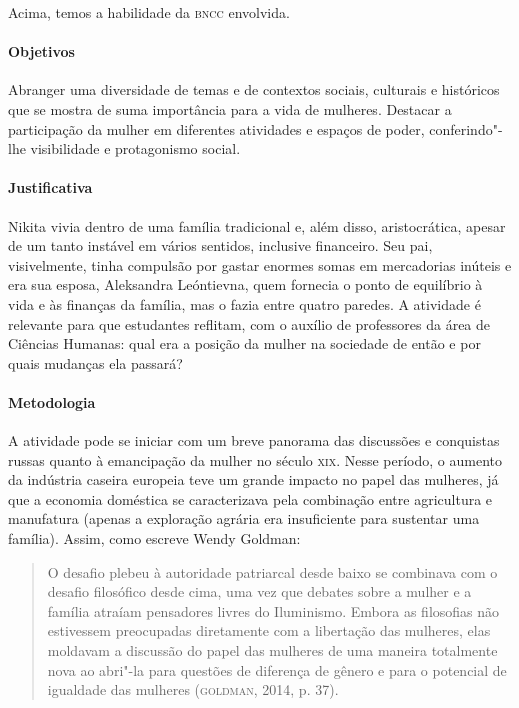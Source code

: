 \documentclass[11pt]{extarticle}
\begin{document}

Acima, temos a habilidade da \textsc{bncc} envolvida.

\paragraph{Objetivos}
Abranger uma diversidade de temas e de contextos sociais, culturais e
históricos que se mostra de suma importância para a vida de mulheres.
Destacar a participação da mulher em diferentes atividades e espaços de
poder, conferindo"-lhe visibilidade e protagonismo social.

\paragraph{Justificativa}
Nikita vivia dentro de uma família tradicional e, além disso,
aristocrática, apesar de um tanto instável em vários sentidos, inclusive
financeiro. Seu pai, visivelmente, tinha compulsão por gastar enormes
somas em mercadorias inúteis e era sua esposa, Aleksandra Leóntievna,
quem fornecia o ponto de equilíbrio à vida e às finanças da família, mas
o fazia entre quatro paredes. A atividade é relevante para que
estudantes reflitam, com o auxílio de professores da área de Ciências Humanas: qual era a posição da mulher na sociedade de então
e por quais mudanças ela passará?

\paragraph{Metodologia}
A atividade pode se iniciar com um breve panorama das discussões e
conquistas russas quanto à emancipação da mulher no século \textsc{xix}. Nesse
período, o aumento da indústria caseira europeia teve um grande impacto
no papel das mulheres, já que a economia doméstica se caracterizava pela
combinação entre agricultura e manufatura (apenas a exploração agrária
era insuficiente para sustentar uma família). Assim, como escreve Wendy
Goldman:

\begin{quote}
O desafio plebeu à autoridade patriarcal desde baixo se combinava com o
desafio filosófico desde cima, uma vez que debates sobre a mulher e a
família atraíam pensadores livres do Iluminismo. Embora as filosofias
não estivessem preocupadas diretamente com a libertação das mulheres,
elas moldavam a discussão do papel das mulheres de uma maneira
totalmente nova ao abri"-la para questões de diferença de gênero e para o
potencial de igualdade das mulheres (\textsc{goldman}, 2014, p. 37).
\end{quote}
\end{document}
